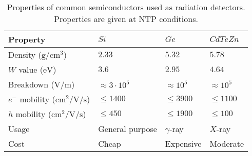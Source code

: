 \begin{table}[!ht]
	\centering
	\caption[Properties of common semiconductors used as radiation detectors.]{Properties of common semiconductors \cite{NSM2005,Eisen1996} used as radiation detectors. Properties are given at NTP conditions.}
	\label{chap3:semiconductor}
	\begin{tabularx}{\linewidth}{lXXX}
    \toprule
    Property & $Si$ & $Ge$ & $CdTeZn$ \\
    \midrule
    Density ($\mathrm{g/cm^3}$)& $2.33$  & $5.32$ & $5.78$ \\
    $W$ value ($\mathrm{eV}$) & $3.6$ & $2.95$ & $4.64$ \\
    Breakdown ($\mathrm{V/m}$) & $\approx 3\cdot10^5$ & $\approx 10^5$ & $\approx 10^5$\\
    $e^{-}$ mobility ($\mathrm{cm^{2}/V/s}$) & $\leq 1400$ & $\leq 3900$ & $\leq 1100$\\
    $h$ mobility ($\mathrm{cm^{2}/V/s}$) & $\leq 450$ & $\leq 1900$ & $\leq 100$ \\
    Usage & General purpose & $\gamma$-ray & $X$-ray\\
    Cost & Cheap & Expensive & Moderate\\
		\bottomrule
	\end{tabularx}
\end{table}
